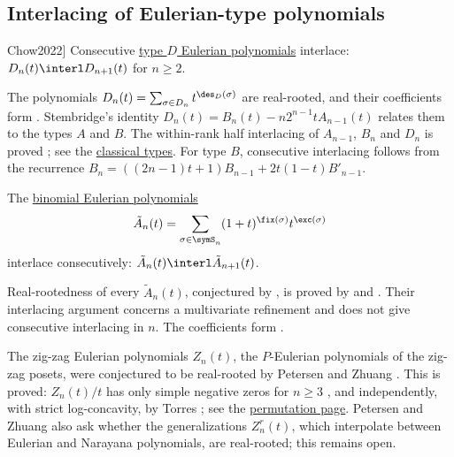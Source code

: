 \subsection[openProblemsEulerianInterlacing]{Interlacing of Eulerian-type polynomials}

\begin{conjecture}[Chow, \cite[Sec.~5]{Chow2022}]
\label{conjTypeDEulerianInterlacing}
Consecutive \hyperref[typeDEulerianPolynomial]{type $D$ Eulerian
polynomials} interlace: $D_n(t)\interl D_{n+1}(t)$ for $n\geq 2$.
\end{conjecture}

The polynomials $D_n(t)=\sum_{\sigma\in D_n}t^{\des_D(\sigma)}$ are
real-rooted, and their coefficients form .  Stembridge's
identity $D_n(t)=B_n(t)-n2^{n-1}tA_{n-1}(t)$ relates them to the types $A$
and $B$.  The within-rank half interlacing of $A_{n-1}$, $B_n$ and $D_n$ is
proved \cite[Thm.~1]{Ma2026x}; see the
\hyperref[classicalTypeEulerianRealRooted]{classical types}.
For type $B$, consecutive interlacing follows from the recurrence
$B_n=((2n-1)t+1)B_{n-1}+2t(1-t)B'_{n-1}$.

\begin{conjecture}
\label{conjBinomialEulerianInterlacing}
The \hyperref[binomialEulerianPolynomial]{binomial Eulerian polynomials}
\[
  \tilde{A}_n(t)=\sum_{\sigma\in\symS_n}(1+t)^{\fix(\sigma)}t^{\exc(\sigma)}
\]
interlace consecutively: $\tilde{A}_n(t)\interl\tilde{A}_{n+1}(t)$.
\end{conjecture}

Real-rootedness of every $\tilde{A}_n(t)$, conjectured by
, is proved by  and
 \cite{HaglundZhang2019}.  Their
interlacing argument concerns a multivariate refinement and does not give
consecutive interlacing in $n$.  The coefficients form .

The zig-zag Eulerian polynomials $Z_n(t)$, the $P$-Eulerian polynomials of
the zig-zag posets, were conjectured to be real-rooted by Petersen and
Zhuang \cite[Conj.~6.1(a)]{PetersenZhuang2024x}.\label{conjZigZagEulerian}
This is proved: $Z_n(t)/t$ has only simple negative zeros for $n\geq3$
\cite[Thm.~7.1]{Alexandersson2026Eulerian}, and independently, with strict
log-concavity, by Torres \cite[Thm.~1.1, Cor.~1.2]{Torres2026x}; see the
\hyperref[zigZagEulerianRealRooted]{permutation page}.  Petersen and Zhuang
also ask whether the generalizations $Z_n^r(t)$, which interpolate between
Eulerian and Narayana polynomials, are real-rooted; this remains open.

